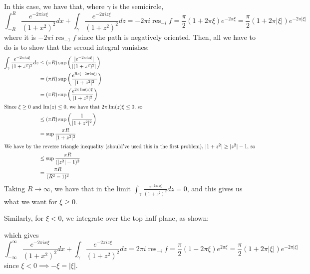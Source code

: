 \documentclass[12pt,letterpaper]{article}
\theoremstyle{definition}
\DeclareMathOperator{\real}{Re}
\DeclareMathOperator{\imag}{Im}
\DeclareMathOperator{\res}{res}
\newcommand{\incfig}[1]{}
\begin{document}
In this case, we have that, where $\gamma$ is the semicircle,
\[
  \int_{-R}^{R}\frac{e^{-2\pi i x \xi}}{(1+x^{2})^{2}}dx + \int_{\gamma} \frac{e^{-2\pi i z \xi}}{(1+z^{2})^{2}}dz = -2\pi i \res_{-i} f = \frac{\pi}{2}(1 + 2\pi \xi)e^{-2\pi\xi} = \frac{\pi}{2}(1 + 2\pi|\xi|)e^{-2\pi|\xi|}
\]
where it is $-2\pi i \res_{-1} f$ since the path is negatively oriented. Then, all we have to do is to show that the second integral vanishes:
\begin{align*}
  \int_{\gamma} \frac{e^{-2\pi i z \xi}}{(1+z^{2})^{2}}dz &\leq (\pi R) \sup \left(\frac{|e^{-2\pi i z \xi}|}{|(1+z^{2})^{2}|}\right) \\
                                                          &= (\pi R)\sup\left(\frac{e^{\real(-2\pi i z \xi)}}{|1+z^{2}|^{2}}\right) \\
                                                          &= (\pi R)\sup\left(\frac{e^{2\pi \imag(z) \xi}}{|1+z^{2}|^{2}}\right) \\
  \intertext{Since $\xi \geq 0$ and $\imag(z) \leq 0$, we have that $2\pi \imag(z) \xi \leq 0$, so}
                                                          &\leq (\pi R)\sup\left(\frac{1}{|1+z^{2}|^{2}}\right) \\
                                                          &= \sup \frac{\pi R}{|1+z^{2}|^{2}} \\
  \intertext{We have by the reverse triangle inequality (should've used this in the first problem), $|1 + z^{2}| \geq |z^{2}| - 1$, so}
                                                          &\leq \sup \frac{\pi R}{(|z^{2}| - 1)^{2}} \\
                                                          &= \frac{\pi R}{(R^{2} - 1)^{2}} \\
\end{align*}
Taking $R \rightarrow \infty$, we have that in the limit $\int_{\gamma} \frac{e^{-2\pi i z \xi}}{(1+z^{2})^{2}}dz = 0$, and this gives us what we want for $\xi \geq 0$.

Similarly, for $\xi < 0$, we integrate over the top half plane, as shown:
\begin{figure}[H]
  \centering
  \incfig{problem32}
\end{figure}
which gives
\[
  \int_{-\infty}^{\infty}\frac{e^{-2\pi i x \xi}}{(1+x^{2})^{2}}dx + \int_{\gamma} \frac{e^{-2\pi i z \xi}}{(1+z^{2})^{2}}dz = 2\pi i \res_{-i} f = \frac{\pi}{2}(1 - 2\pi \xi)e^{2\pi\xi} = \frac{\pi}{2}(1 + 2\pi|\xi|)e^{-2\pi|\xi|}
\]
since $\xi < 0 \implies -\xi = |\xi|$.
\end{document}
